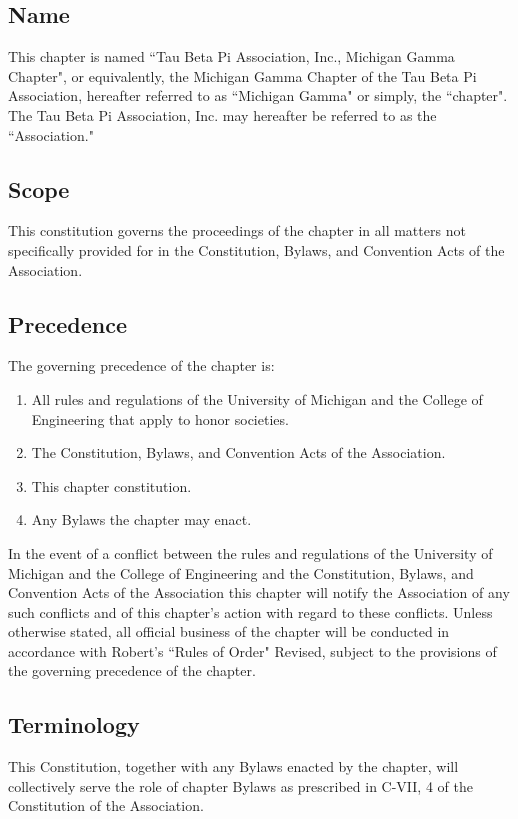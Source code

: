 \subsection{Name} \label{I.1}
This chapter is named ``Tau Beta Pi Association, Inc., Michigan Gamma Chapter", or equivalently, the Michigan Gamma Chapter of the Tau Beta Pi Association, hereafter referred to as ``Michigan Gamma" or simply, the ``chapter".
The Tau Beta Pi Association, Inc. may hereafter be referred to as the ``Association."

\subsection{Scope} \label{I.2}
This constitution governs the proceedings of the chapter in all matters not specifically provided for in the Constitution, Bylaws, and Convention Acts of the Association.

\subsection{Precedence} \label{I.3}
The governing precedence of the chapter is:

\begin{enumerate}
    \item All rules and regulations of the University of Michigan and the College of Engineering that apply to honor societies.
    \item The Constitution, Bylaws, and Convention Acts of the Association.
    \item This chapter constitution.
    \item Any Bylaws the chapter may enact.
\end{enumerate}

In the event of a conflict between the rules and regulations of the University of Michigan and the College of Engineering and the Constitution, Bylaws, and Convention Acts of the Association this chapter will notify the Association of any such conflicts and of this chapter's action with regard to these conflicts. Unless otherwise stated, all official business of the chapter will be conducted in accordance with Robert's ``Rules of Order" Revised, subject to the provisions of the governing precedence of the chapter.

\subsection{Terminology} \label{I.4}
This Constitution, together with any Bylaws enacted by the chapter, will collectively serve the role of chapter Bylaws as prescribed in C-VII, 4 of the Constitution of the Association.

